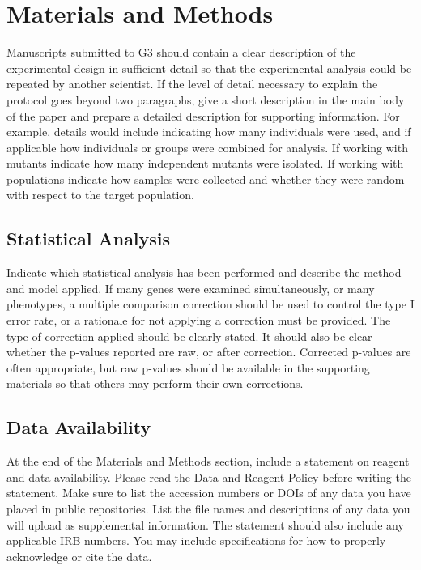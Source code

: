 \documentclass[9pt,twocolumn,twoside]{g3_article/gsag3jnl}
\begin{document}
\section*{Materials and Methods}

Manuscripts submitted to G3 should contain a clear description of the experimental design in sufficient detail so that the experimental analysis could be repeated by another scientist. If the level of detail necessary to explain the protocol goes beyond two paragraphs, give a short description in the main body of the paper and prepare a detailed description for supporting information.  For example, details would include indicating how many individuals were used, and if applicable how individuals or groups were combined for analysis. If working with mutants indicate how many independent mutants were isolated. If working with populations indicate how samples were collected and whether they were random with respect to the target population.

\subsection*{Statistical Analysis} 

Indicate which statistical analysis has been performed and describe the method and model applied. If many genes were examined simultaneously, or many phenotypes, a multiple comparison correction should be used to control the type I error rate, or a rationale for not applying a correction must be provided. The type of correction applied should be clearly stated. It should also be clear whether the p-values reported are raw, or after correction. Corrected p-values are often appropriate, but raw p-values should be available in the supporting materials so that others may perform their own corrections. 

\subsection*{Data Availability}

At the end of the Materials and Methods section, include a statement on reagent and data availability. Please read the Data and Reagent Policy before writing the statement. Make sure to list the accession numbers or DOIs of any data you have placed in public repositories. List the file names and descriptions of any data you will upload as supplemental information. The statement should also include any applicable IRB numbers. You may include specifications for how to properly acknowledge or cite the data.
\end{document}
